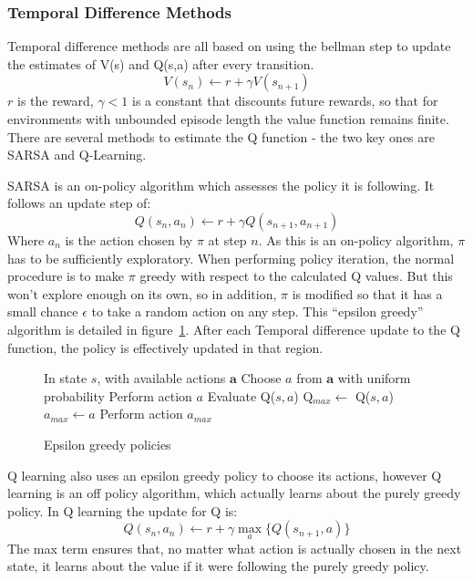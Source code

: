 \subsubsection{Temporal Difference Methods}
Temporal difference methods are all based on using the bellman step to update the estimates of V(s) and Q(s,a) after every transition.
\begin{equation}
V(s_n) \gets r + \gamma V(s_{n+1})
\end{equation}
$r$ is the reward, $\gamma < 1$ is a constant that discounts future rewards, so that for environments with unbounded episode length the value function remains finite. There are several methods to estimate the Q function - the two key ones are SARSA and Q-Learning.

SARSA is an on-policy algorithm which assesses the policy it is following. It follows an update step of:
\begin{equation}
Q(s_n,a_n) \gets r + \gamma Q(s_{n+1}, a_{n+1}) 
\end{equation}
Where $a_n$ is the action chosen by $\pi$ at step $n$. As this is an on-policy algorithm, $\pi$ has to be sufficiently exploratory. When performing policy iteration, the normal procedure is to make $\pi$ greedy with respect to the calculated Q values. But this won't explore enough on its own, so in addition, $\pi$ is modified so that it has a small chance $\epsilon$ to take a random action on any step. This ``epsilon greedy'' algorithm is detailed in figure~\ref{alg:epsgreedy}. After each Temporal difference update to the Q function, the policy is effectively updated in that region.

\begin{figure}
\centering
\begin{minipage}{.7\textwidth}
\begin{algorithmic}
\State In state $s$, with available actions $\boldsymbol{a}$
\WithP[$\epsilon$]
	\State Choose $a$ from $\boldsymbol{a}$ with uniform probability
	\State Perform action $a$
\ElseP
		\State Evaluate Q($s,a$)
			\State Q$_{max} \gets $ Q($s,a$)
			\State $a_{max} \gets a$
		\EndIf
	\EndFor
	\State Perform action $a_{max}$
\EndP
\end{algorithmic}
\end{minipage}
\caption{Epsilon greedy policies}
\label{alg:epsgreedy}
\end{figure}

Q learning also uses an epsilon greedy policy to choose its actions, however Q learning is an off policy algorithm, which actually learns about the purely greedy policy. In Q learning the update for Q is:
\begin{equation}
Q(s_n,a_n) \gets r + \gamma \max_a \{Q(s_{n+1}, a) \}
\end{equation}
The max term ensures that, no matter what action is actually chosen in the next state, it learns about the value if it were following the purely greedy policy.


